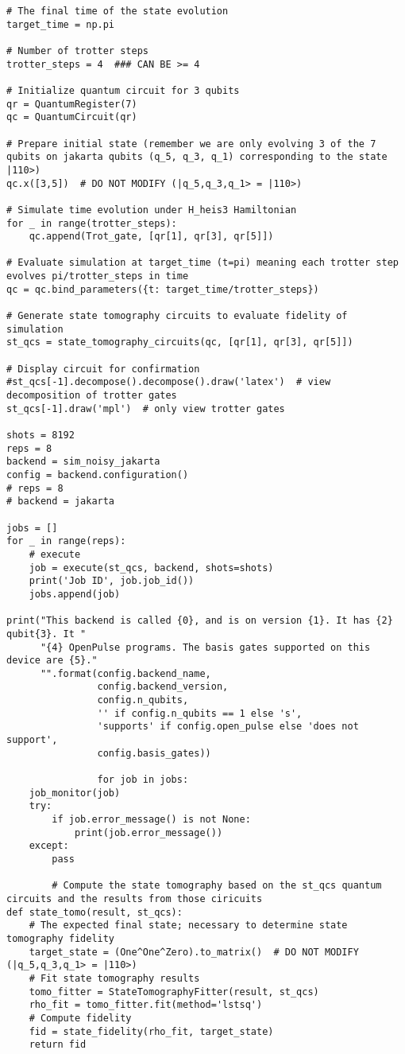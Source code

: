 \begin{verbatim}
# The final time of the state evolution
target_time = np.pi

# Number of trotter steps
trotter_steps = 4  ### CAN BE >= 4

# Initialize quantum circuit for 3 qubits
qr = QuantumRegister(7)
qc = QuantumCircuit(qr)

# Prepare initial state (remember we are only evolving 3 of the 7 qubits on jakarta qubits (q_5, q_3, q_1) corresponding to the state |110>)
qc.x([3,5])  # DO NOT MODIFY (|q_5,q_3,q_1> = |110>)

# Simulate time evolution under H_heis3 Hamiltonian
for _ in range(trotter_steps):
    qc.append(Trot_gate, [qr[1], qr[3], qr[5]])

# Evaluate simulation at target_time (t=pi) meaning each trotter step evolves pi/trotter_steps in time
qc = qc.bind_parameters({t: target_time/trotter_steps})

# Generate state tomography circuits to evaluate fidelity of simulation
st_qcs = state_tomography_circuits(qc, [qr[1], qr[3], qr[5]])

# Display circuit for confirmation
#st_qcs[-1].decompose().decompose().draw('latex')  # view decomposition of trotter gates
st_qcs[-1].draw('mpl')  # only view trotter gates

shots = 8192
reps = 8
backend = sim_noisy_jakarta
config = backend.configuration()
# reps = 8
# backend = jakarta

jobs = []
for _ in range(reps):
    # execute
    job = execute(st_qcs, backend, shots=shots)
    print('Job ID', job.job_id())
    jobs.append(job)

print("This backend is called {0}, and is on version {1}. It has {2} qubit{3}. It "
      "{4} OpenPulse programs. The basis gates supported on this device are {5}."
      "".format(config.backend_name,
                config.backend_version,
                config.n_qubits,
                '' if config.n_qubits == 1 else 's',
                'supports' if config.open_pulse else 'does not support',
                config.basis_gates))

                for job in jobs:
    job_monitor(job)
    try:
        if job.error_message() is not None:
            print(job.error_message())
    except:
        pass

        # Compute the state tomography based on the st_qcs quantum circuits and the results from those ciricuits
def state_tomo(result, st_qcs):
    # The expected final state; necessary to determine state tomography fidelity
    target_state = (One^One^Zero).to_matrix()  # DO NOT MODIFY (|q_5,q_3,q_1> = |110>)
    # Fit state tomography results
    tomo_fitter = StateTomographyFitter(result, st_qcs)
    rho_fit = tomo_fitter.fit(method='lstsq')
    # Compute fidelity
    fid = state_fidelity(rho_fit, target_state)
    return fid


\end{verbatim}
